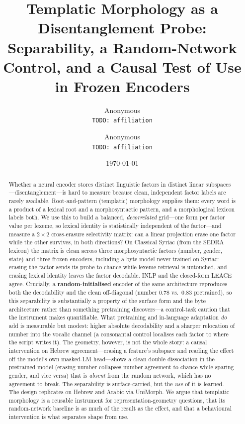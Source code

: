\documentclass[11pt]{article}
\title{Templatic Morphology as a Disentanglement Probe:\\
Separability, a Random-Network Control, and a Causal Test of Use\\
in Frozen Encoders}
\author{Anonymous\\ \texttt{TODO: affiliation} \and Anonymous\\ \texttt{TODO: affiliation}}
\date{\today}
\begin{document}
\maketitle

\begin{abstract}
Whether a neural encoder stores distinct linguistic factors in distinct linear
subspaces---disentanglement---is hard to measure because clean, independent factor
labels are rarely available. Root-and-pattern (templatic) morphology supplies
them: every word is a product of a lexical root and a morphosyntactic pattern, and
a morphological lexicon labels both. We use this to build a balanced,
\emph{decorrelated} grid---one form per factor value per lexeme, so lexical
identity is statistically independent of the factor---and measure a $2\times2$
cross-erasure selectivity matrix: can a linear projection erase one factor while
the other survives, in both directions? On Classical Syriac (from the SEDRA
lexicon) the matrix is clean across three morphosyntactic factors (number, gender,
state) and three frozen encoders, including a byte model never trained on Syriac:
erasing the factor sends its probe to chance while lexeme retrieval is untouched,
and erasing lexical identity leaves the factor decodable. INLP and the closed-form
LEACE agree. Crucially, a \textbf{random-initialised} encoder of the same
architecture reproduces both the decodability and the clean off-diagonal (number
$0.78$ vs.\ $0.83$ pretrained), so this separability is substantially a property of
the surface form and the byte architecture rather than something pretraining
discovers---a control-task caution that the instrument makes quantifiable. What
pretraining and in-language adaptation \emph{do} add is measurable but modest:
higher absolute decodability and a sharper relocation of number into the vocalic
channel (a consonantal control localises each factor to where the script writes
it). The geometry, however, is not the whole story: a causal intervention on
Hebrew agreement---erasing a feature's subspace and reading the effect off the
model's own masked-LM head---shows a clean double dissociation in the pretrained
model (erasing number collapses number agreement to chance while sparing gender,
and vice versa) that is \emph{absent} from the random network, which has no
agreement to break. The separability is surface-carried, but the \emph{use} of it
is learned. The design replicates on Hebrew and Arabic via UniMorph. We argue that
templatic morphology is a reusable instrument for representation-geometry
questions, that its random-network baseline is as much of the result as the effect,
and that a behavioural intervention is what separates shape from use.
\end{abstract}
\end{document}
